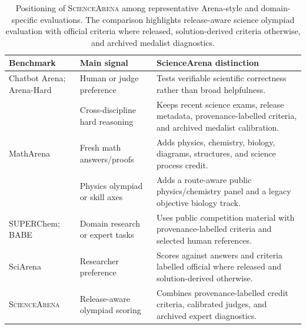 \documentclass[11pt]{article}
\begin{document}
\begin{table}[t]
\centering
\scriptsize
\setlength{\tabcolsep}{5pt}
\renewcommand{\arraystretch}{0.95}
\begin{tabularx}{\textwidth}{p{} p{} Y}
\toprule
\textbf{Benchmark} & \textbf{Main signal} & \textbf{ScienceArena distinction} \\
\midrule
Chatbot Arena; Arena-Hard
& Human or judge preference
& Tests verifiable scientific correctness rather than broad helpfulness. \\
\addlinespace[0.12em]
& Cross-discipline hard reasoning
& Keeps recent science exams, release metadata, provenance-labelled criteria, and archived medalist calibration. \\
\addlinespace[0.12em]
MathArena
& Fresh math answers/proofs
& Adds physics, chemistry, biology, diagrams, structures, and science process credit. \\
\addlinespace[0.12em]
& Physics olympiad or skill axes
& Adds a route-aware public physics/chemistry panel and a legacy objective biology track. \\
\addlinespace[0.12em]
SUPERChem; BABE
& Domain research or expert tasks
& Uses public competition material with provenance-labelled criteria and selected human references. \\
\addlinespace[0.12em]
SciArena
& Researcher preference
& Scores against answers and criteria labelled official where released and solution-derived otherwise. \\
\midrule
\textsc{ScienceArena}
& Release-aware olympiad scoring
& Combines provenance-labelled credit criteria, calibrated judges, and archived expert diagnostics. \\
\bottomrule
\end{tabularx}
\vspace{-0.1cm}
\caption{Positioning of \textsc{ScienceArena} among representative Arena-style and domain-specific evaluations. The comparison highlights release-aware science olympiad evaluation with official criteria where released, solution-derived criteria otherwise, and archived medalist diagnostics.}
\label{tab:arena-positioning}
\vspace{-0.4cm}
\end{table}
\end{document}
